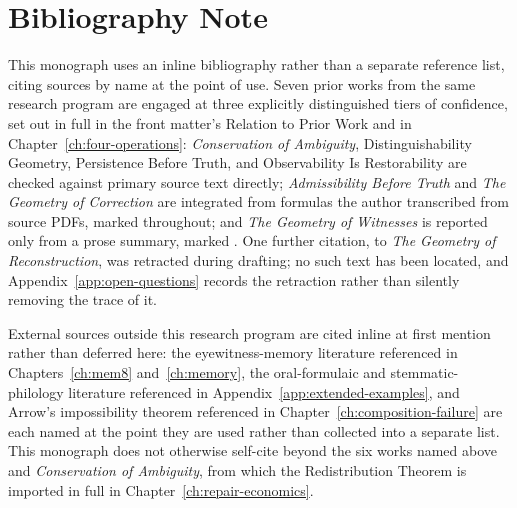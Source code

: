 \chapter*{Bibliography Note}

This monograph uses an inline bibliography rather than a separate
reference list, citing sources by name at the point of use. Seven prior
works from the same research program are engaged at three explicitly
distinguished tiers of confidence, set out in full in the front matter's
Relation to Prior Work and in Chapter~\ref{ch:four-operations}:
\emph{Conservation of Ambiguity}, Distinguishability Geometry,
Persistence Before Truth, and Observability Is Restorability are checked
against primary source text directly; \emph{Admissibility Before Truth}
and \emph{The Geometry of Correction} are integrated from formulas the
author transcribed from source PDFs, marked \transcribed{} throughout;
and \emph{The Geometry of Witnesses} is reported only from a prose
summary, marked \secondary{}. One further citation, to \emph{The
Geometry of Reconstruction}, was retracted during drafting; no such text
has been located, and Appendix~\ref{app:open-questions} records the
retraction rather than silently removing the trace of it.

External sources outside this research program are cited inline at
first mention rather than deferred here: the eyewitness-memory
literature referenced in Chapters~\ref{ch:mem8} and~\ref{ch:memory},
the oral-formulaic and stemmatic-philology literature referenced in
Appendix~\ref{app:extended-examples}, and Arrow's impossibility theorem
referenced in Chapter~\ref{ch:composition-failure} are each named at the
point they are used rather than collected into a separate list. This
monograph does not otherwise self-cite beyond the six works named above
and \emph{Conservation of Ambiguity}, from which the Redistribution
Theorem is imported in full in Chapter~\ref{ch:repair-economics}.
